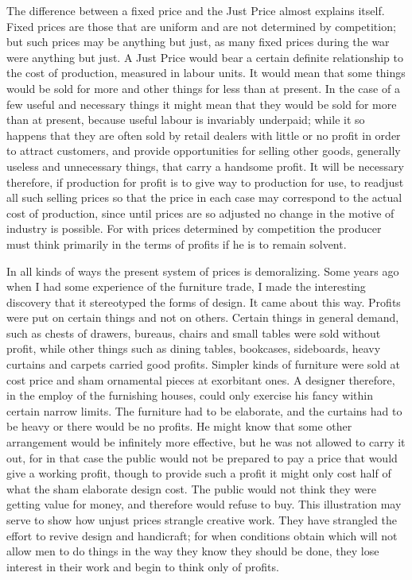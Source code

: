 \documentclass{book}
\begin{document}
The difference between a fixed price and the Just Price almost explains itself. Fixed prices are those that are uniform and are not determined by competition; but such prices may be anything but just, as many fixed prices during the war were anything but just. A Just Price would bear a certain definite relationship to the cost of production, measured in labour units. It would mean that some things would be sold for more and other things for less than at present. In the case of a few useful and necessary things it might mean that they would be sold for more than at present, because useful labour is invariably underpaid; while it so happens that they are often sold by retail dealers with little or no profit in order to attract customers, and provide opportunities for selling other goods, generally useless and unnecessary things, that carry a handsome profit. It will be necessary therefore, if production for profit is to give way to production for use, to readjust all such selling prices so that the price in each case may correspond to the actual cost of production, since until prices are so adjusted no change in the motive of industry is possible. For with prices determined by competition the producer must think primarily in the terms of profits if he is to remain solvent.

In all kinds of ways the present system of prices is demoralizing. Some years ago when I had some experience of the furniture trade, I made the interesting discovery that it stereotyped the forms of design. It came about this way. Profits were put on certain things and not on others. Certain things in general demand, such as chests of drawers, bureaus, chairs and small tables were sold without profit, while other things such as dining tables, bookcases, sideboards, heavy curtains and carpets carried good profits. Simpler kinds of furniture were sold at cost price and sham ornamental pieces at exorbitant ones. A designer therefore, in the employ of the furnishing houses, could only exercise his fancy within certain narrow limits. The furniture had to be elaborate, and the curtains had to be heavy or there would be no profits. He might know that some other arrangement would be infinitely more effective, but he was not allowed to carry it out, for in that case the public would not be prepared to pay a price that would give a working profit, though to provide such a profit it might only cost half of what the sham elaborate design cost. The public would not think they were getting value for money, and therefore would refuse to buy. This illustration may serve to show how unjust prices strangle creative work. They have strangled the effort to revive design and handicraft; for when conditions obtain which will not allow men to do things in the way they know they should be done, they lose interest in their work and begin to think only of profits.
\end{document}

